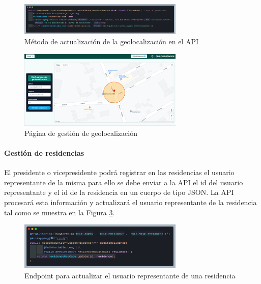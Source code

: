\begin{figure}[H]
    \centering
    \includegraphics[width=0.7\textwidth]{resources/images/api-geolocation-update-method}
    \caption{Método de actualización de la geolocalización en el API}
    \label{fig:api-geolocation-update}
\end{figure}

\begin{figure}[H]
    \centering
    \includegraphics[width=0.7\textwidth]{resources/images/sw-geolocation}
    \caption{Página de gestión de geolocalización}
    \label{fig:sw-geolocation}
\end{figure}

\paragraph{Gestión de residencias}

El presidente o vicepresidente podrá registrar en las residencias el usuario representante de la misma para ello se debe enviar a la API el id del usuario representante y el id de la residencia en un cuerpo de tipo JSON.
La API procesará esta información y actualizará el usuario representante de la residencia tal como se muestra en la Figura \ref{fig:api-residence-update}.

\begin{figure}[H]
    \centering
    \includegraphics[width=0.7\textwidth]{resources/images/api-update-residence-endpoint}
    \caption{Endpoint para actualizar el usuario representante de una residencia}
    \label{fig:api-residence-update}
\end{figure}


